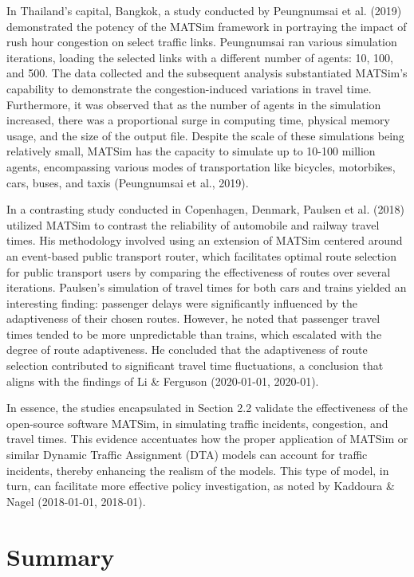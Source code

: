 \documentclass[fancy, oneside, mastersfancy, ms]{byuthesis}
\begin{document}
In Thailand's capital, Bangkok, a study conducted by Peungnumsai et al.
(2019) demonstrated the potency of the MATSim framework in portraying
the impact of rush hour congestion on select traffic links. Peungnumsai
ran various simulation iterations, loading the selected links with a
different number of agents: 10, 100, and 500. The data collected and the
subsequent analysis substantiated MATSim's capability to demonstrate the
congestion-induced variations in travel time. Furthermore, it was
observed that as the number of agents in the simulation increased, there
was a proportional surge in computing time, physical memory usage, and
the size of the output file. Despite the scale of these simulations
being relatively small, MATSim has the capacity to simulate up to 10-100
million agents, encompassing various modes of transportation like
bicycles, motorbikes, cars, buses, and taxis (Peungnumsai et al., 2019).

In a contrasting study conducted in Copenhagen, Denmark, Paulsen et al.
(2018) utilized MATSim to contrast the reliability of automobile and
railway travel times. His methodology involved using an extension of
MATSim centered around an event-based public transport router, which
facilitates optimal route selection for public transport users by
comparing the effectiveness of routes over several iterations. Paulsen's
simulation of travel times for both cars and trains yielded an
interesting finding: passenger delays were significantly influenced by
the adaptiveness of their chosen routes. However, he noted that
passenger travel times tended to be more unpredictable than trains,
which escalated with the degree of route adaptiveness. He concluded that
the adaptiveness of route selection contributed to significant travel
time fluctuations, a conclusion that aligns with the findings of Li \&
Ferguson (2020-01-01, 2020-01).

In essence, the studies encapsulated in Section 2.2 validate the
effectiveness of the open-source software MATSim, in simulating traffic
incidents, congestion, and travel times. This evidence accentuates how
the proper application of MATSim or similar Dynamic Traffic Assignment
(DTA) models can account for traffic incidents, thereby enhancing the
realism of the models. This type of model, in turn, can facilitate more
effective policy investigation, as noted by Kaddoura \& Nagel
(2018-01-01, 2018-01).

\hypertarget{summary}{%
\section{Summary}\label{summary}}
\end{document}
